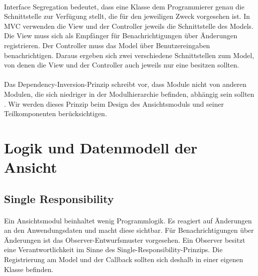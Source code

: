 \documentclass{article}
\begin{document}
\paragraph{}
Interface Segregation bedeutet, dass eine Klasse dem Programmierer genau die Schnittstelle zur Verfügung stellt, die für den jeweiligen Zweck vorgesehen ist. In MVC verwenden die View und der Controller jeweils die Schnittstelle des Models. Die View muss sich als Empfänger für Benachrichtigungen über Änderungen registrieren. Der Controller muss das Model über Benutzereingaben benachrichtigen. Daraus ergeben sich zwei verschiedene Schnittstellen zum Model, von denen die View und der Controller auch jeweils nur eine besitzen sollten.
\paragraph{}
Das Dependency-Inversion-Prinzip schreibt vor, dass Module nicht von anderen Modulen, die sich niedriger in der Modulhierarchie befinden, abhängig sein sollten \autocite[S.~127]{Marti13}. Wir werden dieses Prinzip beim Design des Ansichtsmoduls und seiner Teilkomponenten berücksichtigen.

\section{Logik und Datenmodell der Ansicht}
\subsection{Single Responsibility}
\paragraph{}
Ein Ansichtsmodul beinhaltet wenig Programmlogik. Es reagiert auf Änderungen an den Anwendungsdaten und macht diese sichtbar. Für Benachrichtigungen über Änderungen ist das Observer-Entwurfsmuster vorgesehen. Ein Observer besitzt eine Verantwortlichkeit im Sinne des Single-Responsibility-Prinzips. Die Registrierung am Model und der Callback sollten sich deshalb in einer eigenen Klasse befinden.
\end{document}
